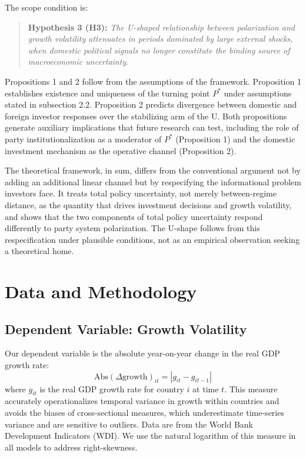 \documentclass[12pt]{article}
\begin{document}
\noindent The scope condition is:

\begin{quote}
\textbf{Hypothesis 3 (H3):} \textit{The U-shaped relationship between
polarization and growth volatility attenuates in periods dominated by large
external shocks, when domestic political signals no longer constitute the
binding source of macroeconomic uncertainty.}
\end{quote}

\noindent Propositions 1 and 2 follow from the assumptions of the framework.
Proposition 1 establishes existence and uniqueness of the turning point $P^*$
under assumptions stated in subsection 2.2. Proposition 2 predicts divergence
between domestic and foreign investor responses over the stabilizing arm of
the U. Both propositions generate auxiliary implications that future research
can test, including the role of party institutionalization as a moderator of
$P^*$ (Proposition 1) and the domestic investment mechanism as the operative
channel (Proposition 2).

The theoretical framework, in sum, differs from the conventional argument not
by adding an additional linear channel but by respecifying the informational
problem investors face. It treats total policy uncertainty, not merely
between-regime distance, as the quantity that drives investment decisions
and growth volatility, and shows that the two components of total policy
uncertainty respond differently to party system polarization. The U-shape
follows from this respecification under plausible conditions, not as an
empirical observation seeking a theoretical home.


\section{Data and Methodology}

\subsection{Dependent Variable: Growth Volatility}

Our dependent variable is the absolute year-on-year change in the real GDP
growth rate:
\[
\text{Abs}(\Delta\text{growth})_{it} = |g_{it} - g_{it-1}|
\]
where $g_{it}$ is the real GDP growth rate for country $i$ at time $t$. This
measure accurately operationalizes temporal variance in growth within
countries \citep{BejarMukherjee2011, Mobarak2005, Denizer2002} and avoids
the biases of cross-sectional measures, which underestimate time-series
variance and are sensitive to outliers. Data are from the World Bank
Development Indicators (WDI). We use the natural logarithm of this measure
in all models to address right-skewness.
\end{document}
